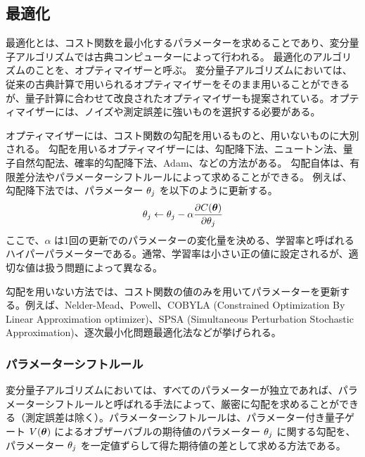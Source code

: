 \subsection{最適化}\label{sec:optimization}
最適化とは、コスト関数を最小化するパラメーターを求めることであり、変分量子アルゴリズムでは古典コンピューターによって行われる。
最適化のアルゴリズムのことを、オプティマイザーと呼ぶ。
変分量子アルゴリズムにおいては、従来の古典計算で用いられるオプティマイザーをそのまま用いることができるが、量子計算に合わせて改良されたオプティマイザーも提案されている。オプティマイザーには、ノイズや測定誤差に強いものを選択する必要がある。

オプティマイザーには、コスト関数の勾配を用いるものと、用いないものに大別される。
勾配を用いるオプティマイザーには、勾配降下法、ニュートン法、量子自然勾配法\cite{stokes2020quantum}、確率的勾配降下法\cite{sweke2020stochastic}、Adam\cite{kingma2017adam}、などの方法がある。
勾配自体は、有限差分法やパラメーターシフトルール\cite{mitarai2018quantum,schuld2019evaluating}によって求めることができる。
例えば、勾配降下法では、パラメーター $\theta_j$ を以下のように更新する。
\begin{align}
    \theta_j \leftarrow \theta_j - \alpha \pdv{C(\boldsymbol{\theta})}{\theta_j}
\end{align}
ここで、$\alpha$ は1回の更新でのパラメーターの変化量を決める、学習率と呼ばれるハイパーパラメーターである。通常、学習率は小さい正の値に設定されるが、適切な値は扱う問題によって異なる。

勾配を用いない方法では、コスト関数の値のみを用いてパラメーターを更新する。例えば、Nelder-Mead\cite{nelder1965simplex}、Powell\cite{powell1964efficient}、COBYLA (Constrained Optimization By Linear Approximation optimizer)\cite{powell1994direct}、SPSA (Simultaneous Perturbation Stochastic Approximation)\cite{spall1992multivariate}、逐次最小化問題最適化法\cite{platt1998sequential,nakanishi2020sequential,parrish2019jacobi,ostaszewski2021structure}などが挙げられる。

\subsubsection*{パラメーターシフトルール}\label{sec:parameter-shift-rule}
変分量子アルゴリズムにおいては、すべてのパラメーターが独立であれば、パラメーターシフトルールと呼ばれる手法によって、厳密に勾配を求めることができる\cite{mitarai2018quantum,schuld2019evaluating}（測定誤差は除く）。パラメーターシフトルールは、パラメーター付き量子ゲート $V(\boldsymbol{\theta})$ によるオブザーバブルの期待値のパラメーター $\theta_j$ に関する勾配を、パラメーター $\theta_j$ を一定値ずらして得た期待値の差として求める方法である。

